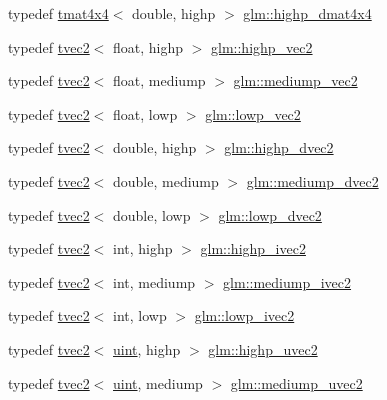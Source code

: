 \begin{DoxyCompactItemize}
typedef \hyperlink{structglm_1_1tmat4x4}{tmat4x4}$<$ double, highp $>$ \hyperlink{group__core__precision_ga46855bd8fdcb8dbc7db5d2aaeb91be69}{glm\+::highp\+\_\+dmat4x4}
\item 
typedef \hyperlink{structglm_1_1tvec2}{tvec2}$<$ float, highp $>$ \hyperlink{group__core__precision_ga84532f0e0c7e2af99edd65dc182aba51}{glm\+::highp\+\_\+vec2}
\item 
typedef \hyperlink{structglm_1_1tvec2}{tvec2}$<$ float, mediump $>$ \hyperlink{group__core__precision_ga949639029259b8bf5c4bc96bd2cc5a59}{glm\+::mediump\+\_\+vec2}
\item 
typedef \hyperlink{structglm_1_1tvec2}{tvec2}$<$ float, lowp $>$ \hyperlink{group__core__precision_ga1b46182364e2054858f9e7a70f8c52bc}{glm\+::lowp\+\_\+vec2}
\item 
typedef \hyperlink{structglm_1_1tvec2}{tvec2}$<$ double, highp $>$ \hyperlink{group__core__precision_ga74ad90a083be6c50f6c285d6ab15a198}{glm\+::highp\+\_\+dvec2}
\item 
typedef \hyperlink{structglm_1_1tvec2}{tvec2}$<$ double, mediump $>$ \hyperlink{group__core__precision_gafc1ed63d5e5d1ddcf67752143f4f5871}{glm\+::mediump\+\_\+dvec2}
\item 
typedef \hyperlink{structglm_1_1tvec2}{tvec2}$<$ double, lowp $>$ \hyperlink{group__core__precision_ga26ff2843d850f4f6ad591540e1ff1818}{glm\+::lowp\+\_\+dvec2}
\item 
typedef \hyperlink{structglm_1_1tvec2}{tvec2}$<$ int, highp $>$ \hyperlink{group__core__precision_ga01acd79fbbe3d93a532276586b5c39ee}{glm\+::highp\+\_\+ivec2}
\item 
typedef \hyperlink{structglm_1_1tvec2}{tvec2}$<$ int, mediump $>$ \hyperlink{group__core__precision_ga38b24c06ac0dfe4dcfbe7abf9a93dbb4}{glm\+::mediump\+\_\+ivec2}
\item 
typedef \hyperlink{structglm_1_1tvec2}{tvec2}$<$ int, lowp $>$ \hyperlink{group__core__precision_gafae8c6e9da91f4c6c1b85af5b8513097}{glm\+::lowp\+\_\+ivec2}
\item 
typedef \hyperlink{structglm_1_1tvec2}{tvec2}$<$ \hyperlink{group__core__precision_ga4fd29415871152bfb5abd588334147c8}{uint}, highp $>$ \hyperlink{group__core__precision_ga386eaa1579a0f5ad51cd7d8fcd52ec16}{glm\+::highp\+\_\+uvec2}
\item 
typedef \hyperlink{structglm_1_1tvec2}{tvec2}$<$ \hyperlink{group__core__precision_ga4fd29415871152bfb5abd588334147c8}{uint}, mediump $>$ \hyperlink{group__core__precision_ga7ec96113b08a8435fd80dd623ffe3e05}{glm\+::mediump\+\_\+uvec2}

\end{DoxyCompactItemize}
